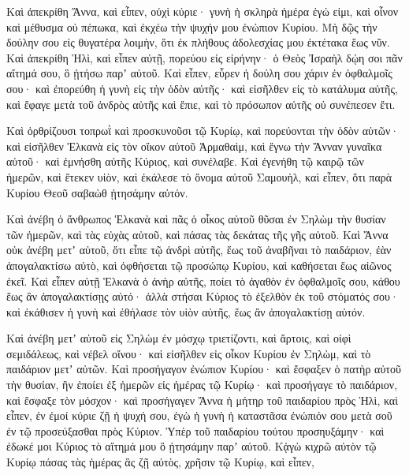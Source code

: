 {Καὶ ἀπεκρίθη Ἄννα, καὶ εἶπεν, οὐχὶ κύριε· γυνὴ ἡ σκληρὰ ἡμέρα ἐγώ εἰμι, καὶ οἶνον καὶ μέθυσμα οὐ πέπωκα, καὶ ἐκχέω τὴν ψυχήν μου ἐνώπιον Κυρίου.
Μὴ δῷς τὴν δούλην σου εἰς θυγατέρα λοιμὴν, ὅτι ἐκ πλήθους ἀδολεσχίας μου ἐκτέτακα ἕως νῦν.
Καὶ ἀπεκρίθη Ἡλὶ, καὶ εἶπεν αὐτῇ, πορεύου εἰς εἰρήνην· ὁ Θεὸς Ἰσραὴλ δῴη σοι πᾶν αἴτημά σου, ὃ ᾐτήσω παρʼ αὐτοῦ.
Καὶ εἶπεν, εὗρεν ἡ δούλη σου χάριν ἐν ὀφθαλμοῖς σου· καὶ ἐπορεύθη ἡ γυνὴ εἰς τὴν ὁδὸν αὐτῆς· καὶ εἰσῆλθεν εἰς τὸ κατάλυμα αὐτῆς, καὶ ἔφαγε μετὰ τοῦ ἀνδρὸς αὐτῆς καὶ ἔπιε, καὶ τὸ πρόσωπον αὐτῆς οὐ συνέπεσεν ἔτι.
\par }{\PP {}Καὶ ὀρθρίζουσι τοπρωῒ καὶ προσκυνοῦσι τῷ Κυρίῳ, καὶ πορεύονται τὴν ὁδὸν αὐτῶν· καὶ εἰσῆλθεν Ἑλκανὰ εἰς τὸν οἴκον αὐτοῦ Ἀρμαθαὶμ, καὶ ἔγνω τὴν Ἄνναν γυναῖκα αὐτοῦ· καὶ ἐμνήσθη αὐτῆς Κύριος, καὶ συνέλαβε.
Καὶ ἐγενήθη τῷ καιρῷ τῶν ἡμερῶν, καὶ ἔτεκεν υἱὸν, καὶ ἐκάλεσε τὸ ὄνομα αὐτοῦ Σαμουὴλ, καὶ εἶπεν, ὅτι παρὰ Κυρίου Θεοῦ σαβαὼθ ᾐτησάμην αὐτόν.
\par }{\PP {}Καὶ ἀνέβη ὁ ἄνθρωπος Ἑλκανὰ καὶ πᾶς ὁ οἶκος αὐτοῦ θῦσαι ἐν Σηλὼμ τὴν θυσίαν τῶν ἡμερῶν, καὶ τὰς εὐχὰς αὐτοῦ, καὶ πάσας τὰς δεκάτας τῆς γῆς αὐτοῦ.
Καὶ Ἄννα οὐκ ἀνέβη μετʼ αὐτοῦ, ὅτι εἶπε τῷ ἀνδρὶ αὐτῆς, ἕως τοῦ ἀναβῆναι τὸ παιδάριον, ἐὰν ἀπογαλακτίσω αὐτὸ, καὶ ὀφθήσεται τῷ προσώπῳ Κυρίου, καὶ καθήσεται ἕως αἰῶνος ἐκεῖ.
Καὶ εἶπεν αὐτῇ Ἑλκανὰ ὁ ἀνὴρ αὐτῆς, ποίει τὸ ἀγαθὸν ἐν ὀφθαλμοῖς σου, κάθου ἕως ἂν ἀπογαλακτίσῃς αὐτό· ἀλλὰ στήσαι Κύριος τὸ ἐξελθὸν ἐκ τοῦ στόματός σου· καὶ ἐκάθισεν ἡ γυνὴ καὶ ἐθήλασε τὸν υἱὸν αὐτῆς, ἕως ἂν ἀπογαλακτίσῃ αὐτόν.
\par }{\PP {}Καὶ ἀνέβη μετʼ αὐτοῦ εἰς Σηλὼμ ἐν μόσχῳ τριετίζοντι, καὶ ἄρτοις, καὶ οἰφὶ σεμιδάλεως, καὶ νέβελ οἴνου· καὶ εἰσῆλθεν εἰς οἶκον Κυρίου ἐν Σηλὼμ, καὶ τὸ παιδάριον μετʼ αὐτῶν.
Καὶ προσήγαγον ἐνώπιον Κυρίου· καὶ ἔσφαξεν ὁ πατὴρ αὐτοῦ τὴν θυσίαν, ἣν ἐποίει ἐξ ἡμερῶν εἰς ἡμέρας τῷ Κυρίῳ· καὶ προσήγαγε τὸ παιδάριον, καὶ ἔσφαξε τὸν μόσχον· καὶ προσήγαγεν Ἄννα ἡ μήτηρ τοῦ παιδαρίου πρὸς Ἡλὶ,
καὶ εἶπεν, ἐν ἐμοί κύριε ζῇ ἡ ψυχή σου, ἐγὼ ἡ γυνὴ ἡ καταστᾶσα ἐνώπιόν σου μετὰ σοῦ ἐν τῷ προσεύξασθαι πρὸς Κύριον.
Ὑπὲρ τοῦ παιδαρίου τούτου προσηυξάμην· καὶ ἐδωκέ μοι Κύριος τὸ αἴτημά μου ὃ ᾐτησάμην παρʼ αὐτοῦ.
Κᾀγὼ κιχρῶ αὐτὸν τῷ Κυρίῳ πάσας τὰς ἡμέρας ἃς ζῇ αὐτὸς, χρῆσιν τῷ Κυρίῳ, καὶ εἶπεν,

}
